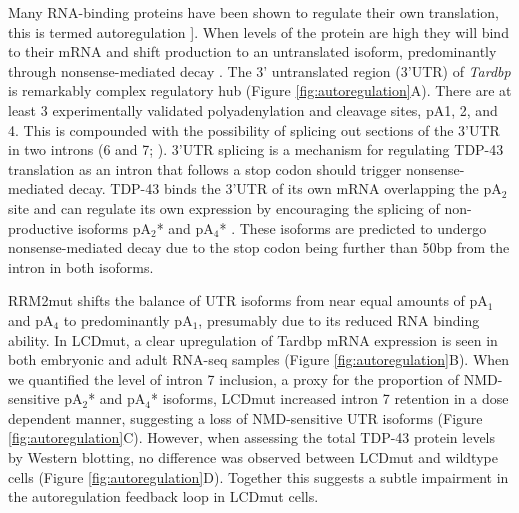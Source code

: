 Many RNA-binding proteins have been shown to regulate their own translation, this is termed autoregulation \citep{Lareau2007,Wollerton2004}]. 
When levels of the protein are high they will bind to their mRNA and shift production to an untranslated isoform, predominantly through nonsense-mediated decay \citep{McGlincy2008-wh}.
The 3' untranslated region (3'UTR) of \textit{Tardbp} is remarkably complex regulatory hub (Figure \ref{fig:autoregulation}A). There are at least 3 experimentally validated polyadenylation and cleavage sites, pA1, 2, and 4. This is compounded with the possibility of splicing out sections of the 3'UTR in two introns (6 and 7; \citep{Koyama2016}). 3'UTR splicing is a mechanism for regulating TDP-43 translation as an intron that follows a stop codon should trigger nonsense-mediated decay. TDP-43 binds the 3'UTR of its own mRNA overlapping the pA$_2$ site  \citep{Polymenidou2011,Tollervey2011} and can regulate its own expression by encouraging the splicing of non-productive isoforms pA$_2$* and pA$_4$* \citep{Koyama2016}. 
These isoforms are predicted to undergo nonsense-mediated decay due to the stop codon  being further than 50bp from the intron in both isoforms.

RRM2mut shifts the balance of UTR isoforms from near equal amounts of pA$_1$ and pA$_4$ to predominantly pA$_1$, presumably due to its reduced RNA binding ability.  
In LCDmut, a clear upregulation of Tardbp mRNA expression is seen in both embryonic and adult RNA-seq samples (Figure \ref{fig:autoregulation}B). 
When we quantified the level of intron 7 inclusion, a proxy for the proportion of NMD-sensitive pA$_2$* and pA$_4$* isoforms, LCDmut increased intron 7 retention in a dose dependent manner, suggesting a loss of NMD-sensitive UTR isoforms (Figure \ref{fig:autoregulation}C). 
However, when assessing the total TDP-43 protein levels by Western blotting, no difference was observed between LCDmut and wildtype cells (Figure \ref{fig:autoregulation}D).
Together this suggests a subtle impairment in the autoregulation feedback loop in LCDmut cells.

